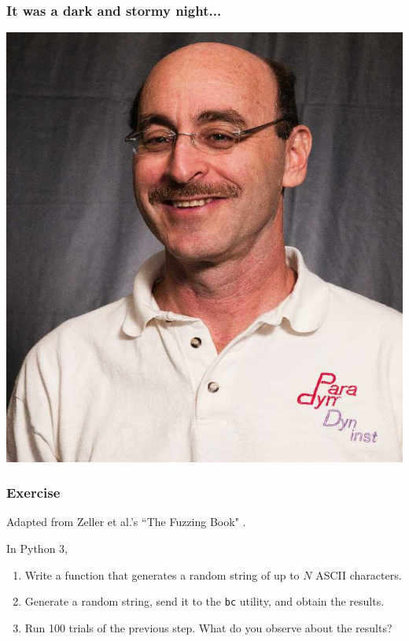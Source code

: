 \documentclass{beamer}
\begin{document}
\begin{frame}
	\frametitle{It was a dark and stormy night...}
	\centering \includegraphics[scale=.2]{miller.jpg}
\end{frame}

\begin{frame}
	\frametitle{Exercise}
	Adapted from Zeller et al.'s ``The Fuzzing Book" \cite{fuzzingbook2024:Fuzzer}. 
	
\vspace{\baselineskip}
	In Python 3, 

	\begin{enumerate}
		\item{Write a function that generates a random string of up to $N$ ASCII characters.}
		\item{Generate a random string, send it to the \texttt{bc} utility, and obtain the results.}
		\item{Run 100 trials of the previous step. What do you observe about the results?}
	\end{enumerate}
\end{frame}
\end{document}
